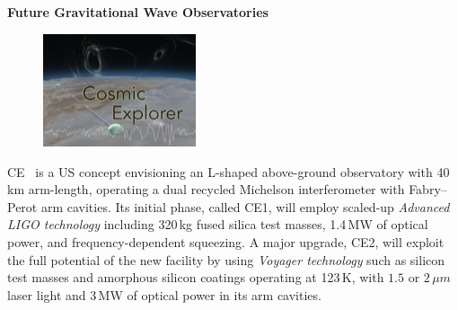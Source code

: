 \begin{DetBox}{\bf Future Gravitational Wave Observatories}
\begin{tcolorbox}[standard jigsaw,colframe=antiquefuchsia!80!black,colback=antiquefuchsia!20!white,opacityback=0.6,coltext=black,size=small, title=Cosmic Explorer (CE)] 
\begin{figure}
\vspace{-10pt}
\includegraphics*[width=0.4\textwidth]{Figures/CE_Thumb.jpg}
\label{fig:CE_Thumb}
\vspace{-20pt}
\end{figure}
CE~\cite{CosmicExplorer2017} is a US concept envisioning an L-shaped above-ground observatory with 40\,km arm-length, operating a dual recycled Michelson interferometer with Fabry--Perot arm cavities. 
Its initial phase, called CE1, will employ scaled-up \emph{Advanced LIGO technology} including 320\,kg fused silica test masses, 1.4\,MW of optical power, and frequency-dependent squeezing. 
A major upgrade, CE2, will exploit the full potential of the new facility by using \emph{Voyager technology} such as silicon test masses and amorphous silicon coatings operating at 123\,K, with $1.5$ or $2\,\mu m$ laser light and 3\,MW of optical power in its arm cavities.

\end{tcolorbox}

\begin{tcolorbox}[standard jigsaw,colframe=azure!70!black,colback=azure!20!white,opacityback=0.6,coltext=black, size=small, title= LIGO Voyager]


\end{tcolorbox}
\end{DetBox}
